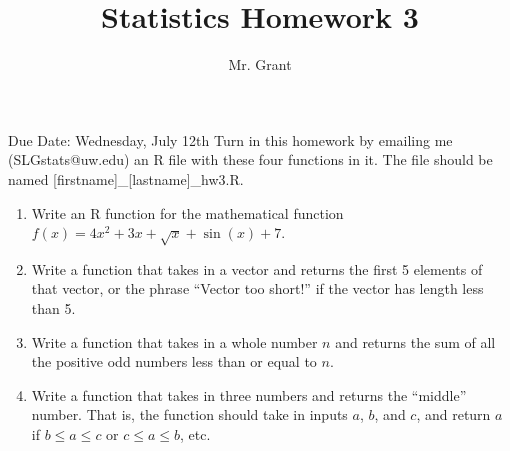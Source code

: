 \documentclass[12pt]{article}
\begin{document}
\title{Statistics Homework 3}
\author{Mr. Grant}
\maketitle

Due Date: Wednesday, July 12th
Turn in this homework by emailing me (SLGstats@uw.edu) an R file with these four functions in it. The file should be named [firstname]\_[lastname]\_hw3.R.

\begin{enumerate}
	\item{Write an R function for the mathematical function $f(x) = 4x^2 + 3x + \sqrt{x} + \sin(x) + 7$.}
	\item{Write a function that takes in a vector and returns the first 5 elements of that vector, or the phrase ``Vector too short!'' if the vector has length less than 5.}
	\item{Write a function that takes in a whole number $n$ and returns the sum of all the positive odd numbers less than or equal to $n$.}
	\item{Write a function that takes in three numbers and returns the ``middle'' number. That is, the function should take in inputs $a$, $b$, and $c$, and return $a$ if $b \le a \le c$ or $c \le a \le b$, etc.}
\end{enumerate}
\end{document}
